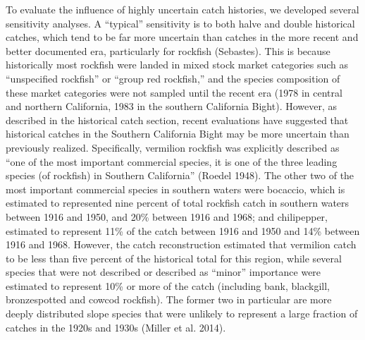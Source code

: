 \documentclass[
  english,
  a4paper,
]{article}
\begin{document}
To evaluate the influence of highly uncertain catch histories, we developed several sensitivity analyses. A ``typical'' sensitivity is to both halve and double historical catches, which tend to be far more uncertain than catches in the more recent and better documented era, particularly for rockfish (Sebastes). This is because historically most rockfish were landed in mixed stock market categories such as ``unspecified rockfish'' or ``group red rockfish,'' and the species composition of these market categories were not sampled until the recent era (1978 in central and northern California, 1983 in the southern California Bight). However, as described in the historical catch section, recent evaluations have suggested that historical catches in the Southern California Bight may be more uncertain than previously realized. Specifically, vermilion rockfish was explicitly described as ``one of the most important commercial species, it is one of the three leading species (of rockfish) in Southern California'' (Roedel 1948). The other two of the most important commercial species in southern waters were bocaccio, which is estimated to represented nine percent of total rockfish catch in southern waters between 1916 and 1950, and 20\% between 1916 and 1968; and chilipepper, estimated to represent 11\% of the catch between 1916 and 1950 and 14\% between 1916 and 1968. However, the catch reconstruction estimated that vermilion catch to be less than five percent of the historical total for this region, while several species that were not described or described as ``minor'' importance were estimated to represent 10\% or more of the catch (including bank, blackgill, bronzespotted and cowcod rockfish). The former two in particular are more deeply distributed slope species that were unlikely to represent a large fraction of catches in the 1920s and 1930s (Miller et al. 2014).
\end{document}
